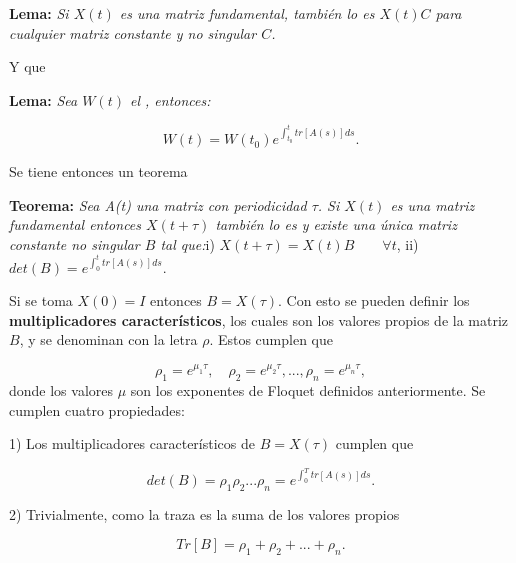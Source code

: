 \documentclass[10pt,a4paper]{report}
\begin{document}
\begin{center}
\textbf{Lema:} \textit{Si $X(t)$ es una matriz fundamental, también lo es $X(t)C$ para cualquier matriz constante y no singular $C$.}
\end{center}Y que

\begin{center}
\textbf{Lema:} \textit{Sea $W(t)$ el ,
  entonces:}

\begin{equation}
W(t) = W(t_0) e^{\int_{t_0}^{t}tr[A(s)]ds}.
\end{equation}
 
\end{center} Se tiene entonces un teorema

\begin{center}
\textbf{Teorema:} \textit{Sea A(t) una matriz con periodicidad $\tau$.
  Si $X(t)$ es una matriz fundamental entonces $X(t+\tau)$ también lo
  es y existe una única matriz constante no singular $B$ tal
  que:}\linebreak \linebreak i) $X(t+\tau) = X(t)B \qquad\forall t$,
\linebreak ii) $det(B) = e^{\int_0^t tr[A(s)]ds}.$
\end{center}
Si se toma $X(0)=I$ entonces $B=X(\tau)$. Con esto se pueden definir
los \textbf{multiplicadores característicos}, los cuales son los
valores propios de la matriz $B$, y se denominan con la letra $\rho$.
Estos cumplen que

\begin{equation}
\rho_1 = e^{\mu_1 \tau}, \quad \rho_2 = e^{\mu_2 \tau}, ... , \rho_n =
e^{\mu_n \tau},
\end{equation} donde los valores $\mu$ son los exponentes de Floquet definidos anteriormente. Se cumplen cuatro propiedades:

1) Los multiplicadores característicos de $B=X(\tau)$ cumplen que

\begin{equation}
det(B) = \rho_1 \rho_2 ... \rho_n = e^{\int_0^T tr[A(s)]ds}.
\end{equation}

2) Trivialmente, como la traza es la suma de los valores propios

\begin{equation}
Tr[B] = \rho_1 + \rho_2 + ... + \rho_n.
\end{equation}
\end{document}
